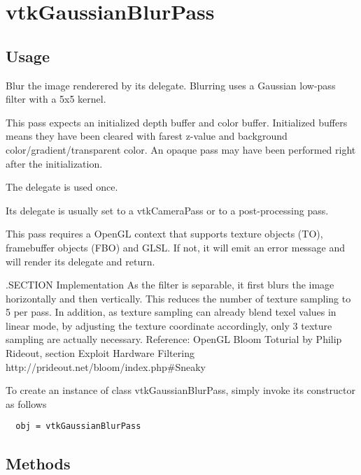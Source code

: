 \section{vtkGaussianBlurPass}

\subsection{Usage}

 Blur the image renderered by its delegate. Blurring uses a Gaussian low-pass
 filter with a 5x5 kernel.

 This pass expects an initialized depth buffer and color buffer.
 Initialized buffers means they have been cleared with farest z-value and
 background color/gradient/transparent color.
 An opaque pass may have been performed right after the initialization.

 The delegate is used once.

 Its delegate is usually set to a vtkCameraPass or to a post-processing pass.
 
 This pass requires a OpenGL context that supports texture objects (TO),
 framebuffer objects (FBO) and GLSL. If not, it will emit an error message
 and will render its delegate and return.

 .SECTION Implementation
 As the filter is separable, it first blurs the image horizontally and then
 vertically. This reduces the number of texture sampling to 5 per pass.
 In addition, as texture sampling can already blend texel values in linear
 mode, by adjusting the texture coordinate accordingly, only 3 texture
 sampling are actually necessary.
 Reference: OpenGL Bloom Toturial by Philip Rideout, section
 Exploit Hardware Filtering  http://prideout.net/bloom/index.php\#Sneaky

To create an instance of class vtkGaussianBlurPass, simply
invoke its constructor as follows
\begin{verbatim}
  obj = vtkGaussianBlurPass
\end{verbatim}
\subsection{Methods}

